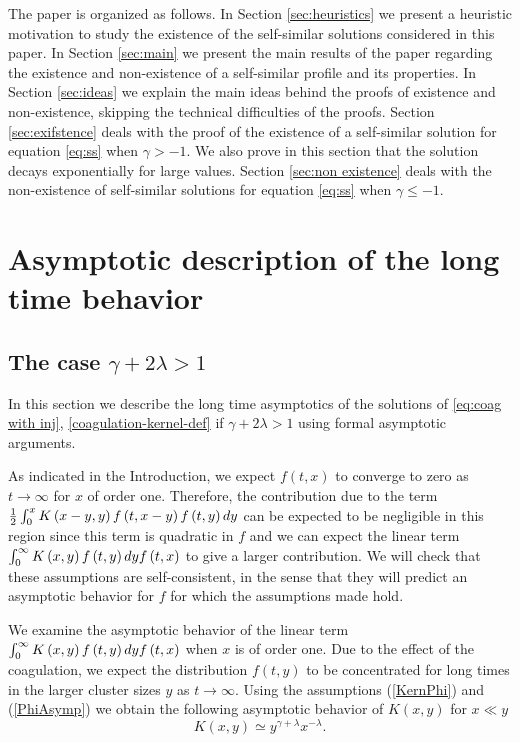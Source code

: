 \documentclass[11pt]{article}
\numberwithin{equation}{section}
\theoremstyle{plain}
\newcommand{\der}{\textup{d}}
\begin{document}
The paper is organized as follows.
In Section \ref{sec:heuristics} we present a heuristic motivation to study the existence of the self-similar solutions considered in this paper.
In Section \ref{sec:main} we present the main results of the paper regarding the existence and non-existence of a self-similar profile and its properties.
In Section \ref{sec:ideas} we explain the main ideas behind the proofs of existence and non-existence, skipping the technical difficulties of the proofs. 
Section \ref{sec:exifstence} deals with the proof of the existence of a self-similar solution for equation \eqref{eq:ss} when $\gamma > -1$. We also prove in this section that the solution decays exponentially for large values. Section \ref{sec:non existence} deals with the non-existence of self-similar solutions for equation \eqref{eq:ss} when $\gamma \leq -1$.
 

\section{Asymptotic description of the long time behavior
\label{sec:heuristics}}

\subsection{The case $\gamma + 2 \lambda > 1$}

In this section we describe the long time asymptotics of the solutions of
\eqref{eq:coag with inj}, \eqref{coagulation-kernel-def} if $\gamma+2\lambda> 1$ using
formal asymptotic arguments.

As indicated in the Introduction, we expect $f\left(  t, x\right)  $ to
converge to zero as $t\rightarrow\infty$ for $x$ of order one. Therefore, the
contribution due to the term $\frac{1}{2}\int_{0}^{x}K\left(  x-y,y\right)
f\left(  t,x-y\right)  f\left(  t,y\right)  \der y$ can be expected to be
negligible in this region since this term is quadratic in $f$ and we can
expect the linear term $\int_{0}^{\infty}K\left(  x,y\right)   f\left(  t,y\right)  \der y f\left(
t,x\right) $ to give a larger contribution. We will
check that these assumptions are self-consistent, in the sense that they will
predict an asymptotic behavior for $f$ for which the assumptions made hold.

We examine the asymptotic behavior of the linear term $\int_{0}^{\infty
}K\left(  x,y\right)   f\left(  t,y\right)  \der y f\left(  t,x\right)$
when $x$ is of order one. 
Due to the effect of the coagulation, we expect the
distribution $f\left(  t,y\right)  $ to be concentrated for long times in the
larger cluster sizes $y$ as $t\rightarrow\infty.$ Using the assumptions
(\ref{KernPhi}) and (\ref{PhiAsymp}) we obtain the following asymptotic
behavior of $K\left(  x,y\right)  $ for $x\ll y$%
\begin{equation}
K\left(  x,y\right) \simeq  y^{\gamma+\lambda}x^{-\lambda}\label{B1}.%
\end{equation}
\end{document}
